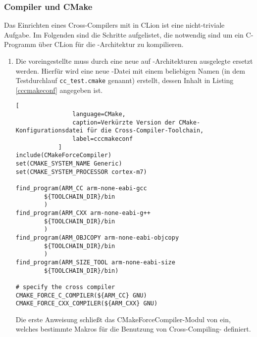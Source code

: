         \subsubsection{Compiler und CMake}
        Das Einrichten eines Cross-Compilers mit  in CLion ist eine nicht-triviale Aufgabe. Im Folgenden sind
        die Schritte aufgelistet, die notwendig sind um ein C-Programm über CLion für die -Architektur zu
        kompilieren.
        \begin{enumerate}
            \item Die voreingestellte  muss durch eine neue auf -Architekturen ausgelegte 
            ersetzt werden. Hierfür wird eine neue -Datei mit einem beliebigen Namen (in dem Testdurchlauf
            \texttt{cc\_test.cmake} genannt) erstellt, dessen Inhalt in Listing \ref{cccmakeconf} angegeben ist.
            \begin{lstlisting}[
                language=CMake,
                caption=Verkürzte Version der CMake-Konfigurationsdatei für die Cross-Compiler-Toolchain,
                label=cccmakeconf
            ]
include(CMakeForceCompiler)
set(CMAKE_SYSTEM_NAME Generic)
set(CMAKE_SYSTEM_PROCESSOR cortex-m7)

find_program(ARM_CC arm-none-eabi-gcc
        ${TOOLCHAIN_DIR}/bin
        )
find_program(ARM_CXX arm-none-eabi-g++
        ${TOOLCHAIN_DIR}/bin
        )
find_program(ARM_OBJCOPY arm-none-eabi-objcopy
        ${TOOLCHAIN_DIR}/bin
        )
find_program(ARM_SIZE_TOOL arm-none-eabi-size
        ${TOOLCHAIN_DIR}/bin)

# specify the cross compiler
CMAKE_FORCE_C_COMPILER(${ARM_CC} GNU)
CMAKE_FORCE_CXX_COMPILER(${ARM_CXX} GNU)
            \end{lstlisting}
            Die erste Anweisung schließt das CMakeForceCompiler-Modul von  ein, welches bestimmte Makros für die
            Benutzung von Cross-Compiling- definiert\citep[vgl.~module/CMakeForceCompiler]{CMAKEDOC}.


\end{enumerate}
